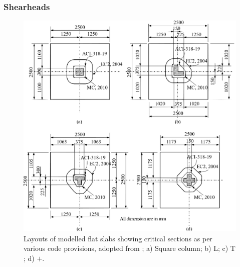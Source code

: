 \documentclass[twocolumn]{article} %
\begin{document}
\subsubsection{Shearheads}
    \begin{figure}\centering
        \includegraphics[width=\columnwidth]{Figures/akf3.pdf}\caption{Layouts of modelled flat slabs showing critical sections as per various code provisions, adopted from \citep{akinpelu2023}; a) Square column; b) $\mathrm{L}$; c) $\mathrm{T}$; d) $\mathrm{+}$.}\label{akf3}
        \end{figure}
\end{document}
